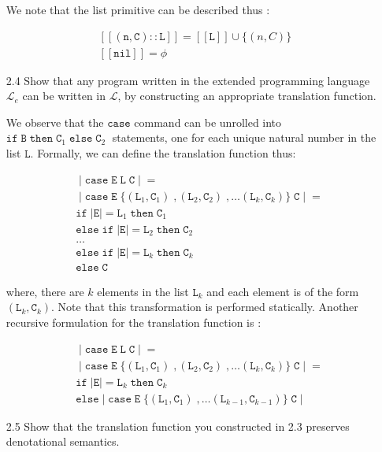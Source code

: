 \documentclass[a4paper,10pt]{article}
\newcommand{\E}{\mathtt{E}}
\newcommand{\B}{\mathtt{B}}
\newcommand{\C}{\mathtt{C}}
\newcommand{\LL}{\mathtt{L}}
\newcommand{\ifsym}{\mathtt{if}}
\newcommand{\then}{\mathtt{then}}
\newcommand{\elsesym}{\mathtt{else}}
\newcommand{\case}{\mathtt{case}}
\newcommand{\denot}[1]{\mathtt{[[{#1}]]}}
\newcommand{\question}[1]
{\color{DarkBlue}#1 \color{Black} \newline}
\begin{document}
\begin{enumerate}
We note that the list primitive can be described thus :

\begin{align*}
\denot{(n, C) :: L} = \denot{L} \cup \{ (n,C) \} \\
\denot{nil} = \phi 
\end{align*}

\question{
\item[2.4] Show that any program written in the extended programming language $\mathcal{L}_e$ 
can be written in $\mathcal{L}$, by constructing an appropriate translation function.
}

We observe that the $\case$ command can be unrolled into $\ifsym \; \B
\; \then \; \C_1 \; \elsesym \; \C_2 \;$ statements, one for each unique natural
number in the list $\LL$. 
Formally, we can define the translation function thus:

\begin{align*}
& \; | \; \case \; \E \; \LL \; \C \; |\; = \\
& \; | \; \case \; \E \; \{ (\LL_{1}, \C_{1}) \; , (\LL_{2}, \C_{2}) \;, \ldots
(\LL_{k}, \C_{k}) \} \; \C \; |\; = \\
& \ifsym \; |\E| = \LL_{1} \; \then \; \C_{1} \\
& \elsesym \; \ifsym \; |\E| = \LL_{2} \; \then \; \C_{2} \\
& \ldots \\
& \elsesym \; \ifsym \; |\E| = \LL_{k} \; \then \; \C_{k} \\
& \elsesym \; \C \;
\end{align*} 

where, there are $k$ elements in the list $\LL_{k}$ and each element is of the
form $(\LL_{k}, \C_{k})$. Note that this transformation is performed statically.
Another recursive formulation for the translation function is :

\begin{align*}
& \; | \; \case \; \E \; \LL \; \C \; |\; = \\
& \; | \; \case \; \E \; \{ (\LL_{1}, \C_{1}) \; , (\LL_{2}, \C_{2}) \;, \ldots
(\LL_{k}, \C_{k}) \} \; \C \; |\; = \\
& \ifsym \; |\E| = \LL_{k} \; \then \; \C_{k} \\
& \elsesym \;
| \; \case \; \E \; \{ (\LL_{1}, \C_{1}) \;, \ldots
(\LL_{k-1}, \C_{k-1}) \} \; \C \; |\;
\end{align*} 

\question{
\item[2.5] Show that the translation function you constructed in 2.3 preserves denotational semantics.
}


\end{enumerate}
\end{document}
